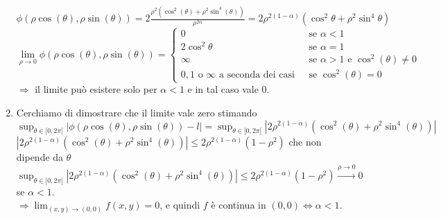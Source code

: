 \begin{exbar}
\begin{example}
\begin{enumerate}
		$\phi(\rho\cos(\theta),\rho\sin(\theta))=2\frac{\rho^2(\cos^2(\theta)+\rho^2\sin^4(\theta))}{\rho^{2\alpha}}=2\rho^{2(1-\alpha)}(\cos^2\theta+\rho^2\sin^4\theta)$
		\begin{equation*}
			\lim_{\rho\rightarrow0}\phi(\rho\cos(\theta),\rho\sin(\theta))=\begin{cases}
				0&\text{  se  }\alpha<1\\
				2\cos^2\theta&\text{  se  }\alpha=1\\
				\infty&\text{  se  }\alpha>1\text{  e  }\cos^2(\theta)\neq 0\\
				0,1\text{  o  }\infty\text{  a seconda dei casi  }&\text{  se  }\cos^2(\theta)=0
			\end{cases}
		\end{equation*}
		$\Rightarrow$ il limite può esistere solo per $\alpha< 1$ e in tal caso vale $0$.
		\item Cerchiamo di dimostrare che il limite vale zero stimando\\
		$\sup_{\theta \in[0,2\pi[}|\phi(\rho\cos(\theta),\rho\sin(\theta))-l|=\sup_{\theta \in[0,2\pi[}|2\rho^{2(1-\alpha)}(\cos^2(\theta)+\rho^2\sin^4(\theta))|$\\
		$|2\rho^{2(1-\alpha)}(\cos^2(\theta)+\rho^2\sin^4(\theta))|\leq 2\rho^{2(1-\alpha)}(1-\rho^2)$ che non dipende da $\theta$\\
		$\sup_{\theta \in[0,2\pi[}|2\rho^{2(1-\alpha)}(\cos^2(\theta)+\rho^2\sin^4(\theta))|\leq2\rho^{2(1-\alpha)}(1-\rho^2)\xrightarrow{\rho \rightarrow 0} 0 $ se $\alpha <1$.\\
		$\Rightarrow \lim_{(x,y)\rightarrow(0,0)}f(x,y)=0$, e quindi $f$ è continua in $(0,0)\Leftrightarrow \alpha<1$.
	\end{enumerate}
\end{example}
\end{exbar}


